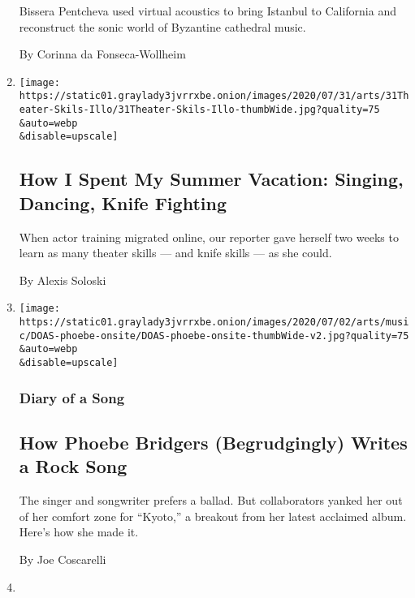 \begin{enumerate}
  Bissera Pentcheva used virtual acoustics to bring Istanbul to
  California and reconstruct the sonic world of Byzantine cathedral
  music.

  By Corinna da Fonseca-Wollheim
\item
  \href{/2020/07/30/theater/theater-classes-at-home.html}{}

  \texttt{[image: https://static01.graylady3jvrrxbe.onion/images/2020/07/31/arts/31Theater-Skils-Illo/31Theater-Skils-Illo-thumbWide.jpg?quality=75\\\&auto=webp\\\&disable=upscale]}

  \hypertarget{how-i-spent-my-summer-vacation-singing-dancing-knife-fighting}{%
  \subsection{How I Spent My Summer Vacation: Singing, Dancing, Knife
  Fighting}\label{how-i-spent-my-summer-vacation-singing-dancing-knife-fighting}}

  When actor training migrated online, our reporter gave herself two
  weeks to learn as many theater skills --- and knife skills --- as she
  could.

  By Alexis Soloski
\item
  \href{/2020/07/30/arts/music/phoebe-bridgers-kyoto.html}{}

  \texttt{[image: https://static01.graylady3jvrrxbe.onion/images/2020/07/02/arts/music/DOAS-phoebe-onsite/DOAS-phoebe-onsite-thumbWide-v2.jpg?quality=75\\\&auto=webp\\\&disable=upscale]}

  \hypertarget{diary-of-a-song}{%
  \subsubsection{Diary of a Song}\label{diary-of-a-song}}

  \hypertarget{how-phoebe-bridgers-begrudgingly-writes-a-rock-song}{%
  \subsection{How Phoebe Bridgers (Begrudgingly) Writes a Rock
  Song}\label{how-phoebe-bridgers-begrudgingly-writes-a-rock-song}}

  The singer and songwriter prefers a ballad. But collaborators yanked
  her out of her comfort zone for ``Kyoto,'' a breakout from her latest
  acclaimed album. Here's how she made it.

  By Joe Coscarelli
\item
  \href{/2020/07/30/nyregion/coronavirus-beatles-nyc.html}{}


\end{enumerate}
